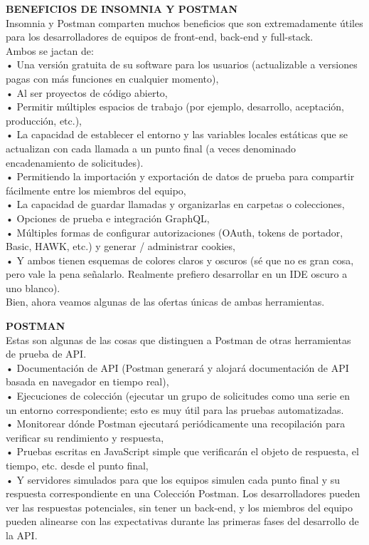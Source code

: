 \documentclass[twoside,twocolumn]{article}
\begin{document}
\textbf{BENEFICIOS DE INSOMNIA Y POSTMAN}\\
Insomnia y Postman comparten muchos beneficios que son extremadamente útiles para los desarrolladores de equipos de front-end, back-end y full-stack.
\\Ambos se jactan de:
\\•	Una versión gratuita de su software para los usuarios (actualizable a versiones pagas con más funciones en cualquier momento),
\\•	Al ser proyectos de código abierto,
\\•	Permitir múltiples espacios de trabajo (por ejemplo, desarrollo, aceptación, producción, etc.),
\\•	La capacidad de establecer el entorno y las variables locales estáticas que se actualizan con cada llamada a un punto final (a veces denominado encadenamiento de solicitudes).
\\•	Permitiendo la importación y exportación de datos de prueba para compartir fácilmente entre los miembros del equipo,
\\•	La capacidad de guardar llamadas y organizarlas en carpetas o colecciones,
\\•	Opciones de prueba e integración GraphQL,
\\•	Múltiples formas de configurar autorizaciones (OAuth, tokens de portador, Basic, HAWK, etc.) y generar / administrar cookies,
\\•	Y ambos tienen esquemas de colores claros y oscuros (sé que no es gran cosa, pero vale la pena señalarlo. Realmente prefiero desarrollar en un IDE oscuro a uno blanco).
\\Bien, ahora veamos algunas de las ofertas únicas de ambas herramientas.

\textbf{POSTMAN}\\
Estas son algunas de las cosas que distinguen a Postman de otras herramientas de prueba de API.
\\•	Documentación de API (Postman generará y alojará documentación de API basada en navegador en tiempo real),
\\•	Ejecuciones de colección (ejecutar un grupo de solicitudes como una serie en un entorno correspondiente; esto es muy útil para las pruebas automatizadas.
\\•	Monitorear dónde Postman ejecutará periódicamente una recopilación para verificar su rendimiento y respuesta,
\\•	Pruebas escritas en JavaScript simple que verificarán el objeto de respuesta, el tiempo, etc. desde el punto final,
\\•	Y servidores simulados para que los equipos simulen cada punto final y su respuesta correspondiente en una Colección Postman. Los desarrolladores pueden ver las respuestas potenciales, sin tener un back-end, y los miembros del equipo pueden alinearse con las expectativas durante las primeras fases del desarrollo de la API.
\\
\end{document}
